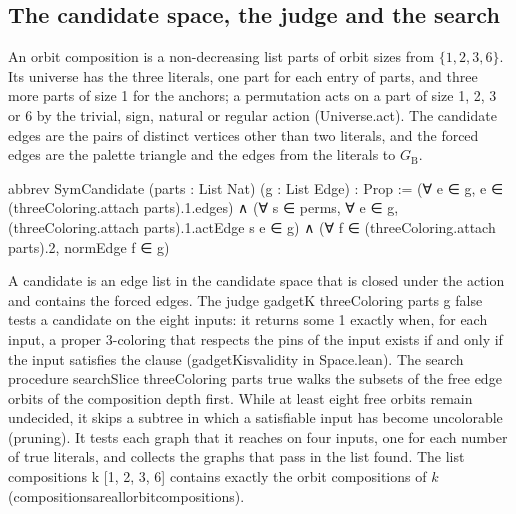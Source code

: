 \documentclass[11pt,a4paper]{article}
\newcommand{\leanus}{\textunderscore\allowbreak}
\newcommand{\lean}[1]{{\ttfamily\let\_\leanus #1}}
\newcommand{\GB}{G_{\mathrm{B}}}
\begin{document}
\subsection{The candidate space, the judge and the search}
An orbit composition is a non-decreasing list \lean{parts} of orbit sizes
from $\{1,2,3,6\}$. Its universe has the three literals, one part for each
entry of \lean{parts}, and three more parts of size 1 for the anchors; a
permutation acts on a part of size 1, 2, 3 or 6 by the trivial, sign,
natural or regular action (\lean{Universe.act}). The candidate edges are the
pairs of distinct vertices other than two literals, and the forced edges are
the palette triangle and the edges from the literals to $\GB$.
\begin{code}
abbrev SymCandidate (parts : List Nat) (g : List Edge) : Prop :=
  (∀ e ∈ g, e ∈ (threeColoring.attach parts).1.edges) ∧
  (∀ s ∈ perms, ∀ e ∈ g, (threeColoring.attach parts).1.actEdge s e ∈ g) ∧
  (∀ f ∈ (threeColoring.attach parts).2, normEdge f ∈ g)
\end{code}
A candidate is an edge list in the candidate space that is closed under the
action and contains the forced edges. The judge
\lean{gadgetK threeColoring parts g false} tests a candidate on the eight
inputs: it returns \lean{some 1} exactly when, for each input, a proper
3-coloring that respects the pins of the input exists if and only if the
input satisfies the clause (\lean{gadgetK\_is\_validity} in
\lean{Space.lean}). The search procedure
\lean{searchSlice threeColoring parts true} walks the subsets of the free
edge orbits of the composition depth first. While at least eight free orbits
remain undecided, it skips a subtree in which a satisfiable input has become
uncolorable (pruning). It tests each graph that it reaches on four inputs,
one for each number of true literals, and collects the graphs that pass in
the list \lean{found}. The list
\lean{compositions k [1, 2, 3, 6]} contains exactly the orbit compositions
of $k$ (\lean{compositions\_are\_all\_orbit\_compositions}).
\end{document}
